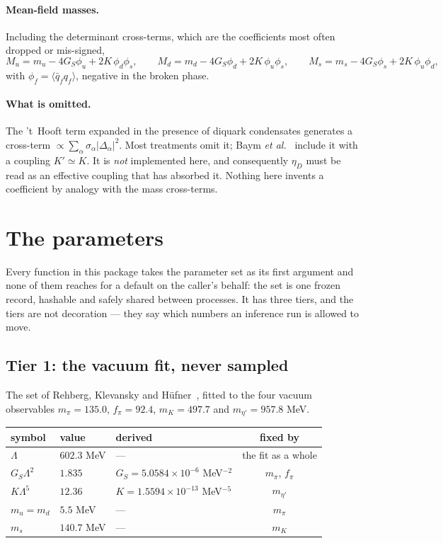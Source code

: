 \documentclass[aps,prc,onecolumn,superscriptaddress,nofootinbib,10pt]{revtex4-2}
\newcommand{\Lam}{\Lambda}
\newcommand{\GS}{G_S}
\begin{document}
\paragraph{Mean-field masses.} Including the determinant cross-terms, which are
the coefficients most often dropped or mis-signed,
\begin{equation}
  M_u = m_u - 4\GS \phi_u + 2K\,\phi_d \phi_s , \qquad
  M_d = m_d - 4\GS \phi_d + 2K\,\phi_u \phi_s , \qquad
  M_s = m_s - 4\GS \phi_s + 2K\,\phi_u \phi_d ,
  \label{eq:massgap}
\end{equation}
with $\phi_f = \langle \bar q_f q_f\rangle$, negative in the broken phase.

\paragraph{What is omitted.} The 't~Hooft term expanded in the presence of
diquark condensates generates a cross-term $\propto \sum_\alpha \sigma_\alpha
|\Delta_\alpha|^2$. Most treatments omit it; Baym \textit{et
al.}~\cite{Baym2018} include it with a coupling $K' \simeq K$. It is
\emph{not} implemented here, and consequently $\eta_D$ must be read as an
effective coupling that has absorbed it. Nothing here invents a coefficient by
analogy with the mass cross-terms.

\section{The parameters}
\label{sec:parameters}

Every function in this package takes the parameter set as its first argument
and none of them reaches for a default on the caller's behalf: the set is one
frozen record, hashable and safely shared between processes. It has three
tiers, and the tiers are not decoration --- they say which numbers an inference
run is allowed to move.

\subsection{Tier 1: the vacuum fit, never sampled}

The set of Rehberg, Klevansky and H\"ufner~\cite{Rehberg1996}, fitted to the
four vacuum observables $m_\pi = 135.0$, $f_\pi = 92.4$, $m_K = 497.7$ and
$m_{\eta'} = 957.8$ MeV.

\begin{center}
\begin{tabular}{lllc}
\toprule
symbol & value & derived & fixed by \\
\midrule
$\Lam$          & $602.3$ MeV  & ---
  & the fit as a whole \\
$\GS \Lam^2$    & $1.835$      & $\GS = 5.0584\times10^{-6}$ MeV$^{-2}$
  & $m_\pi$, $f_\pi$ \\
$K \Lam^5$      & $12.36$      & $K = 1.5594\times10^{-13}$ MeV$^{-5}$
  & $m_{\eta'}$ \\
$m_u = m_d$     & $5.5$ MeV    & ---
  & $m_\pi$ \\
$m_s$           & $140.7$ MeV  & ---
  & $m_K$ \\
\bottomrule
\end{tabular}
\end{center}
\end{document}
